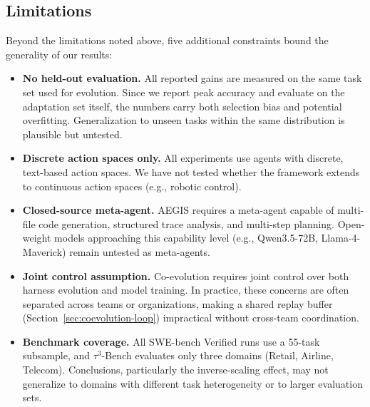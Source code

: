 \subsection{Limitations}

Beyond the limitations noted above, five additional constraints bound the generality of our results:
\begin{itemize}
  \item \textbf{No held-out evaluation.} All reported gains are measured on the same task set used for evolution. Since we report peak accuracy and evaluate on the adaptation set itself, the numbers carry both selection bias and potential overfitting. Generalization to unseen tasks within the same distribution is plausible but untested.
  \item \textbf{Discrete action spaces only.} All experiments use agents with discrete, text-based action spaces. We have not tested whether the framework extends to continuous action spaces (e.g., robotic control).
  \item \textbf{Closed-source meta-agent.} AEGIS requires a meta-agent capable of multi-file code generation, structured trace analysis, and multi-step planning. Open-weight models approaching this capability level (e.g., Qwen3.5-72B, Llama-4-Maverick) remain untested as meta-agents.
  \item \textbf{Joint control assumption.} Co-evolution requires joint control over both harness evolution and model training. In practice, these concerns are often separated across teams or organizations, making a shared replay buffer (Section~\ref{sec:coevolution-loop}) impractical without cross-team coordination.
  \item \textbf{Benchmark coverage.} All SWE-bench Verified runs use a 55-task subsample, and $\tau^3$-Bench evaluates only three domains (Retail, Airline, Telecom). Conclusions, particularly the inverse-scaling effect, may not generalize to domains with different task heterogeneity or to larger evaluation sets.
\end{itemize}

